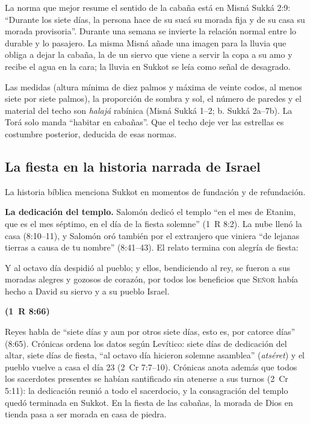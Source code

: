 \documentclass[11pt,letterpaper]{article}
\newcommand{\SENOR}{\textsc{Señor}}
\newcommand{\fuente}[1]{\par\hfill{\upshape\bfseries\small\textcolor{tierraroja}{#1}}}
\begin{document}
La norma que mejor resume el sentido de la cabaña está en Misná Sukká 2:9: ``Durante los siete días, la persona hace de su sucá su morada fija y de su casa su morada provisoria''. Durante una semana se invierte la relación normal entre lo durable y lo pasajero. La misma Misná añade una imagen para la lluvia que obliga a dejar la cabaña, la de un siervo que viene a servir la copa a su amo y recibe el agua en la cara; la lluvia en Sukkot se leía como señal de desagrado.

\begin{nota}[Precisión]
Las medidas (altura mínima de diez palmos y máxima de veinte codos, al menos siete por siete palmos), la proporción de sombra y sol, el número de paredes y el material del techo son \emph{halajá} rabínica (Misná Sukká 1--2; b. Sukká 2a--7b). La Torá solo manda ``habitar en cabañas''. Que el techo deje ver las estrellas es costumbre posterior, deducida de esas normas.
\end{nota}

\subsection{La fiesta en la historia narrada de Israel}
La historia bíblica menciona Sukkot en momentos de fundación y de refundación.

\textbf{La dedicación del templo.} Salomón dedicó el templo ``en el mes de Etanim, que es el mes séptimo, en el día de la fiesta solemne'' (1~R 8:2). La nube llenó la casa (8:10--11), y Salomón oró también por el extranjero que viniera ``de lejanas tierras a causa de tu nombre'' (8:41--43). El relato termina con alegría de fiesta:

\begin{cita}Y al octavo día despidió al pueblo; y ellos, bendiciendo al rey, se fueron a sus moradas alegres y gozosos de corazón, por todos los beneficios que \SENOR{} había hecho a David su siervo y a su pueblo Israel.\fuente{(1~R 8:66)}\end{cita}

Reyes habla de ``siete días y aun por otros siete días, esto es, por catorce días'' (8:65). Crónicas ordena los datos según Levítico: siete días de dedicación del altar, siete días de fiesta, ``al octavo día hicieron solemne asamblea'' (\emph{atséret}) y el pueblo vuelve a casa el día 23 (2~Cr 7:7--10). Crónicas anota además que todos los sacerdotes presentes se habían santificado sin atenerse a sus turnos (2~Cr 5:11): la dedicación reunió a todo el sacerdocio, y la consagración del templo quedó terminada en Sukkot. En la fiesta de las cabañas, la morada de Dios en tienda pasa a ser morada en casa de piedra.
\end{document}
